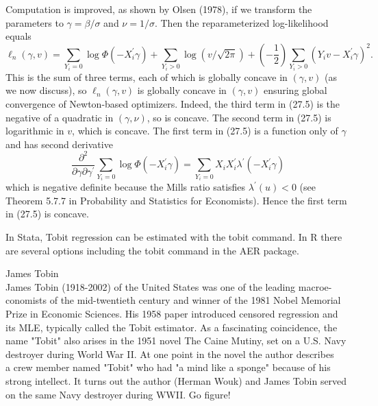 \documentclass[10pt]{article}
\begin{document}
Computation is improved, as shown by Olsen (1978), if we transform the parameters to $\gamma=\beta / \sigma$ and $\nu=1 / \sigma$. Then the reparameterized log-likelihood equals
$$
\ell_{n}(\gamma, v)=\sum_{Y_{i}=0} \log \Phi\left(-X_{i}^{\prime} \gamma\right)+\sum_{Y_{i}>0} \log (v / \sqrt{2 \pi})+\left(-\frac{1}{2}\right) \sum_{Y_{i}>0}\left(Y_{i} v-X_{i}^{\prime} \gamma\right)^{2} .
$$
This is the sum of three terms, each of which is globally concave in $(\gamma, v)$ (as we now discuss), so $\ell_{n}(\gamma, v)$ is globally concave in $(\gamma, v)$ ensuring global convergence of Newton-based optimizers. Indeed, the third term in (27.5) is the negative of a quadratic in $(\gamma, \nu)$, so is concave. The second term in (27.5) is logarithmic in $v$, which is concave. The first term in (27.5) is a function only of $\gamma$ and has second derivative
$$
\frac{\partial^{2}}{\partial \gamma \partial \gamma^{\prime}} \sum_{Y_{i}=0} \log \Phi\left(-X_{i}^{\prime} \gamma\right)=\sum_{Y_{i}=0} X_{i} X_{i}^{\prime} \lambda^{\prime}\left(-X_{i}^{\prime} \gamma\right)
$$
which is negative definite because the Mills ratio satisfies $\lambda^{\prime}(u)<0$ (see Theorem 5.7.7 in Probability and Statistics for Economists). Hence the first term in (27.5) is concave.

In Stata, Tobit regression can be estimated with the tobit command. In R there are several options including the tobit command in the AER package.

James Tobin\\
James Tobin (1918-2002) of the United States was one of the leading macroe-\\
conomists of the mid-twentieth century and winner of the 1981 Nobel Memorial\\
Prize in Economic Sciences. His 1958 paper introduced censored regression and\\
its MLE, typically called the Tobit estimator. As a fascinating coincidence, the\\
name "Tobit" also arises in the 1951 novel The Caine Mutiny, set on a U.S. Navy\\
destroyer during World War II. At one point in the novel the author describes\\
a crew member named "Tobit" who had "a mind like a sponge" because of his\\
strong intellect. It turns out the author (Herman Wouk) and James Tobin served\\
on the same Navy destroyer during WWII. Go figure!
\end{document}

